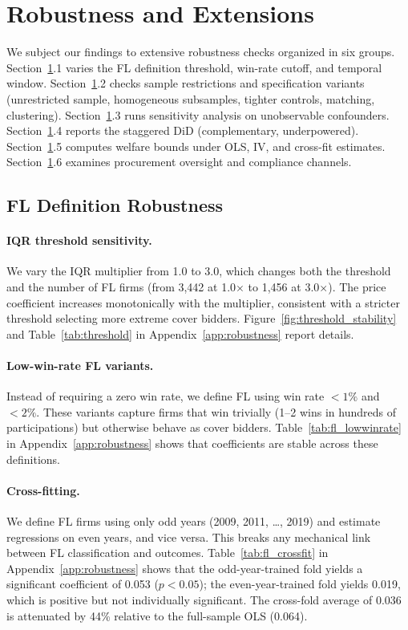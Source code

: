 \section{Robustness and Extensions}
\label{sec:robustness}

We subject our findings to extensive robustness checks organized in six
groups. Section~\ref{sec:robustness}.1 varies the FL definition
threshold, win-rate cutoff, and temporal window.
Section~\ref{sec:robustness}.2 checks sample restrictions and
specification variants (unrestricted sample, homogeneous subsamples,
tighter controls, matching, clustering).
Section~\ref{sec:robustness}.3 runs sensitivity analysis on unobservable
confounders. Section~\ref{sec:robustness}.4 reports the staggered DiD
(complementary, underpowered). Section~\ref{sec:robustness}.5 computes
welfare bounds under OLS, IV, and cross-fit estimates.
Section~\ref{sec:robustness}.6 examines procurement oversight and
compliance channels.

\subsection{FL Definition Robustness}

\paragraph{IQR threshold sensitivity.}
We vary the IQR multiplier from 1.0 to 3.0, which changes both the
threshold and the number of FL firms (from 3,442 at 1.0$\times$ to 1,456
at 3.0$\times$). The price coefficient increases monotonically with the
multiplier, consistent with a stricter threshold selecting more extreme
cover bidders.
Figure~\ref{fig:threshold_stability} and Table~\ref{tab:threshold} in
Appendix~\ref{app:robustness} report details.

\paragraph{Low-win-rate FL variants.}
Instead of requiring a zero win rate, we define FL using win rate
$< 1\%$ and $< 2\%$. These variants capture firms that win trivially
(1--2 wins in hundreds of participations) but otherwise behave as cover
bidders. Table~\ref{tab:fl_lowwinrate} in Appendix~\ref{app:robustness}
shows that coefficients are stable across these definitions.

\paragraph{Cross-fitting.}
We define FL firms using only odd years (2009, 2011, \ldots, 2019) and
estimate regressions on even years, and vice versa. This breaks any
mechanical link between FL classification and outcomes.
Table~\ref{tab:fl_crossfit} in Appendix~\ref{app:robustness} shows that
the odd-year-trained fold yields a significant coefficient of 0.053 %
($p < 0.05$); the even-year-trained fold yields 0.019, which is
positive but not individually significant. The cross-fold average of
0.036 is attenuated by 44\% relative to the full-sample OLS (0.064).

